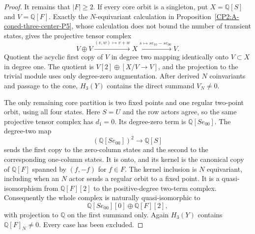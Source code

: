 \begin{proof}
It remains that $|F|\ge2$.  If every core orbit is a
singleton, put $X=\mathbb Q[S]$ and $V=\mathbb Q[F]$.
Exactly the $N$-equivariant calculation in
Proposition~\ref{CP2:A-coned-three-center-P5}, whose
calculation does not bound the number of transient states,
gives the projective tensor complex
\[
 V\oplus V\xrightarrow{(v,w)\mapsto v+w}X
 \xrightarrow{s\mapsto se_{10}-se_{00}}V.
\]
Quotient the acyclic first copy of $V$ in degree two
mapping identically onto $V\subset X$ in degree one.
The quotient is
$V[2]\oplus[X/V\to V]$, and the projection to the
trivial module uses only degree-zero augmentation.
After derived $N$ coinvariants and passage to the cone,
$H_3(Y)$ contains the direct summand $V_N\ne0$.

The only remaining core partition is two fixed points
and one regular two-point orbit, using all four states.
Here $S=U$ and the row actors agree, so the same
projective tensor complex has $d_1=0$.  Its degree-zero
term is $\mathbb Q[Se_{00}]$.  The degree-two map
\[
 (\mathbb Q[Se_{00}])^2\longrightarrow\mathbb Q[S]
\]
sends the first copy to the zero-column states and the
second to the corresponding one-column states.  It is
onto, and its kernel is the canonical copy of
$\mathbb Q[F]$ spanned by $(f,-f)$ for $f\in F$.
The kernel inclusion is $N$ equivariant, including when
an $N$ actor sends a regular orbit to a fixed point.
It is a quasi-isomorphism from $\mathbb Q[F][2]$ to
the positive-degree two-term complex.  Consequently the
whole complex is naturally quasi-isomorphic to
\[
 \mathbb Q[Se_{00}][0]\oplus\mathbb Q[F][2],
\]
with projection to $\mathbb Q$ on the first summand
only.  Again $H_3(Y)$ contains
$\mathbb Q[F]_N\ne0$.  Every case has been excluded.
\end{proof}

